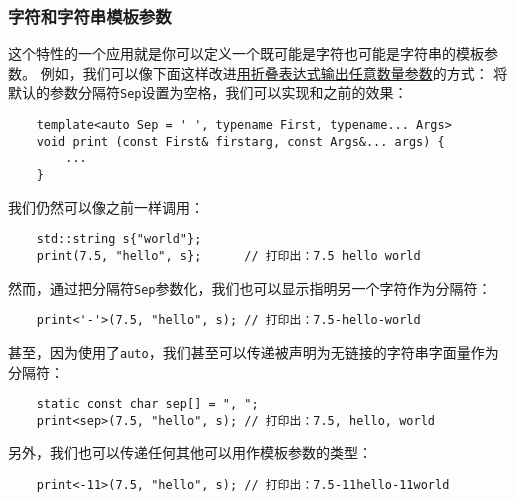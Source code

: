 \subsubsection{字符和字符串模板参数}\label{ch13.1.1}
这个特性的一个应用就是你可以定义一个既可能是字符也可能是字符串的模板参数。
例如，我们可以像下面这样改进\hyperref[输出任意个参数的print]{用折叠表达式输出任意数量参数}的方式：
将默认的参数分隔符\texttt{Sep}设置为空格，我们可以实现和之前的效果：
\begin{lstlisting}
    template<auto Sep = ' ', typename First, typename... Args>
    void print (const First& firstarg, const Args&... args) {
        ...
    }
\end{lstlisting}
我们仍然可以像之前一样调用：
\begin{lstlisting}
    std::string s{"world"};
    print(7.5, "hello", s};      // 打印出：7.5 hello world
\end{lstlisting}
然而，通过把分隔符\texttt{Sep}参数化，我们也可以显示指明另一个字符作为分隔符：
\begin{lstlisting}
    print<'-'>(7.5, "hello", s); // 打印出：7.5-hello-world
\end{lstlisting}
甚至，因为使用了\texttt{auto}，我们甚至可以传递被声明为无链接的字符串字面量作为分隔符：
\begin{lstlisting}
    static const char sep[] = ", ";
    print<sep>(7.5, "hello", s); // 打印出：7.5, hello, world
\end{lstlisting}
另外，我们也可以传递任何其他可以用作模板参数的类型：
\begin{lstlisting}
    print<-11>(7.5, "hello", s); // 打印出：7.5-11hello-11world
\end{lstlisting}

